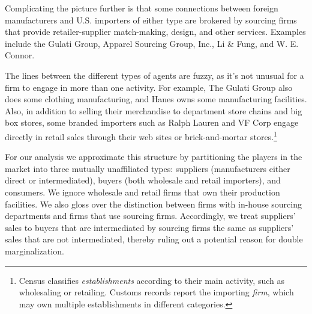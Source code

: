 \documentclass[12pt]{article} \usepackage{amsmath,amssymb,amsthm,geometry,graphicx,setspace,algorithm,algpseudocode,float}
\begin{document}
Complicating the picture further is that some connections between foreign manufacturers and U.S. importers of either type are brokered by sourcing firms that provide retailer-supplier match-making,
design, and other services. Examples include the Gulati Group, Apparel Sourcing
Group, Inc., Li \& Fung, and W. E. Connor.

The lines between the different types of agents are fuzzy, as it's not
unusual for a firm to engage in more than one activity. For example, The
Gulati Group also does some clothing manufacturing, and Hanes owns some manufacturing facilities. Also, in addition to selling their
merchandise to department store chains and big box stores, some branded
importers such as Ralph Lauren and VF Corp engage directly in retail sales through their web sites or
brick-and-mortar stores.\footnote{Census classifies \emph{establishments} according to their main activity, such as wholesaling or retailing. Customs records report the importing \emph{firm}, which may own multiple establishments in different categories.\medskip}   

For our analysis we approximate this
structure by partitioning the players in the  market into three
mutually unaffiliated types: suppliers (manufacturers either direct or intermediated), buyers (both wholesale and retail importers),
and consumers. We ignore wholesale and retail firms that
own their production facilities. We also gloss over the distinction
between firms with in-house sourcing departments and firms that use sourcing firms. Accordingly, we treat suppliers' sales to buyers that are intermediated by sourcing firms the same as suppliers' sales that are not intermediated, thereby ruling out a potential reason for double marginalization.
\end{document}
